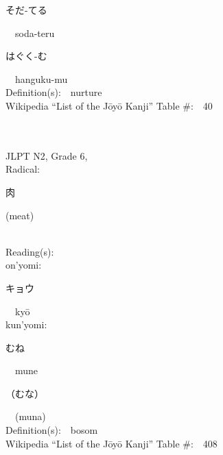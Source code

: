 \begin{multicols}{2}
{\hspace*{2em}}{\begin{CJK}{UTF8}{min} そだ-てる \end{CJK}}\ \ soda-teru\ \ \\
{\hspace*{2em}}{\begin{CJK}{UTF8}{min} はぐく-む \end{CJK}}\ \ hanguku-mu\ \ \\
Definition(s):\ \ nurture \\
Wikipedia ``List of the J\=oy\=o Kanji'' Table \#:\ \ 40 \\
\ \ \\
{\fontsize{34pt}{40pt}  }\ \ \\  %
{JLPT N2, Grade 6, \\Radical:\ \ {\begin{CJK}{UTF8}{min} 肉 \end{CJK}} (meat) } \\
Reading(s):\ \ \\
{\hspace*{1em}}on'yomi:\ \ \\
{\hspace*{2em}}{\begin{CJK}{UTF8}{min} キョウ \end{CJK}}\ \ ky\=o\ \ \\
{\hspace*{1em}}kun'yomi:\ \ \\
{\hspace*{2em}}{\begin{CJK}{UTF8}{min} むね \end{CJK}}\ \ mune\ \ \\
{\hspace*{2em}}{\begin{CJK}{UTF8}{min} （むな） \end{CJK}}\ \ (muna)\ \ \\
Definition(s):\ \ bosom \\
Wikipedia ``List of the J\=oy\=o Kanji'' Table \#:\ \ 408 \\
\ \ \\
{\fontsize{34pt}{40pt}  }\ \ \\  %

\end{multicols}
